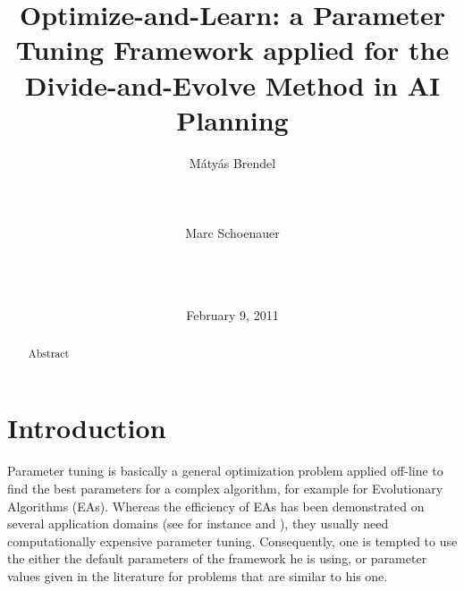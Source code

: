 \documentclass{acm_proc_article-sp}
\begin{document}
\title{Optimize-and-Learn: a Parameter Tuning Framework applied for the Divide-and-Evolve Method in AI Planning}


\author{
\alignauthor
M{\'a}ty{\'a}s Brendel\\
       \\
       \\
       \\
\alignauthor
Marc Schoenauer\\
       \\
       \\
       \\
}

\date{February 9, 2011}
\maketitle
\begin{abstract}
\noindent Abstract
\end{abstract}



\section{Introduction}

Parameter tuning is basically a general optimization problem applied off-line to find the best parameters for a complex algorithm, for example for Evolutionary Algorithms (EAs). Whereas the efficiency of EAs has been demonstrated on several application domains (see for instance \cite{practice08} and \cite{ParameterSettingBook07}), they usually need computationally expensive parameter tuning. Consequently, one is tempted to use the either the default parameters of the framework he is using, or parameter values given in the literature for problems that are similar to his one. 
\end{document}
